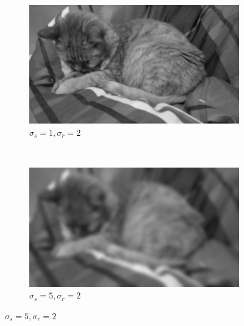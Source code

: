 \documentclass[a4spaper]{article}
\begin{document}
\begin{figure}[ht]
	\centering
	\begin{subfigure}[h]{0.48\textwidth}
		\centering
		\includegraphics[width=\textwidth]{jerry_flt_1_2}
		\caption*{$\sigma_s = 1, \sigma_r = 2$}
	\end{subfigure}
	~ 
	\begin{subfigure}[h]{0.48\textwidth}
		\centering
		\includegraphics[width=\textwidth]{jerry_flt_5_2}
		\caption*{$\sigma_s = 5, \sigma_r = 2$}
	\end{subfigure}	
	

\end{figure}
\end{document}
